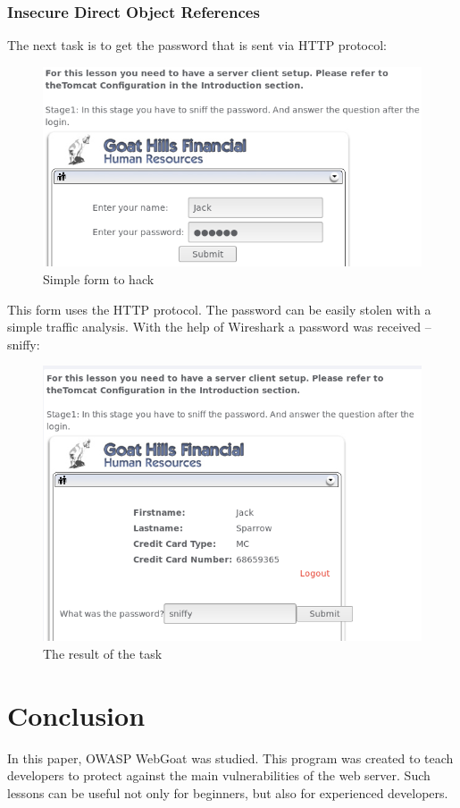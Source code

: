 \documentclass[14pt,a4paper,report]{report}
\begin{document}
\subsubsection{Insecure Direct Object References}

The next task is to get the password that is sent via HTTP protocol:

\begin{figure}[h!]
	\centering
	\includegraphics[scale = 0.50]{images/12.png}
	\caption{Simple form to hack}
\end{figure}

This form uses the HTTP protocol. The password can be easily stolen with a simple traffic analysis. With the help of Wireshark a password was received -- sniffy:

\begin{figure}[h!]
	\centering
	\includegraphics[scale = 0.50]{images/13.png}
	\caption{The result of the task}
\end{figure}

\section{Conclusion}

In this paper, OWASP WebGoat was studied. This program was created to teach developers to protect against the main vulnerabilities of the web server. Such lessons can be useful not only for beginners, but also for experienced developers.
\end{document}
